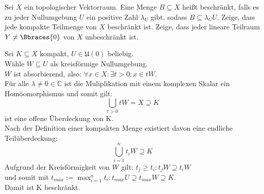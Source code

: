 \begin{exercise}

Sei $X$ ein topologischer Vektorraum.
Eine Menge $B \subseteq X$ heißt beschränkt, falls es zu jeder Nullumgebung $U$ ein positive Zahl $\lambda_U$ gibt, sodass $B \subseteq \lambda_U U$.
Zeige, dass jede kompakte Teilmenge von $X$ beschränkt ist. Zeige, dass jeder lineare Teilraum $Y \neq \Bbraces{0}$ von $X$ unbeschränkt ist.

\end{exercise}

\begin{solution}

Sei $K \subseteq X$ kompakt, $U \in \mathfrak{U}(0)$ beliebig. \\
Wähle $W \subseteq U$ als kreisförmige Nullumgebung. \\
$W$ ist absorbierend, also: $\forall x \in X: \exists t > 0: x \in tW$. \\
Für alle $ \lambda \neq 0 \in \mathbb{C}$ ist die Muliplikation mit einem komplexen Skalar
ein Homöomorphismus und somit gilt: \\
\[ \bigcup_{t > 0}tW = X \supseteq K \] ist eine offene Überdeckung von K. \\
Nach der Definition einer kompakten Menge existiert davon eine endliche Teilüberdeckung: \\
\[ \bigcup_{i=1}^nt_iW \supseteq K \]
Aufgrund der Kreisförmigkeit von $W$ gilt: $t_j \geq t_i: t_jW \supseteq t_iW$ \\
und somit mit $t_{max} := \max_{i=1}^nt_i: t_{max}U \supseteq t_{max}W \supseteq K$. \\
Damit ist K beschränkt.

\end{solution}
